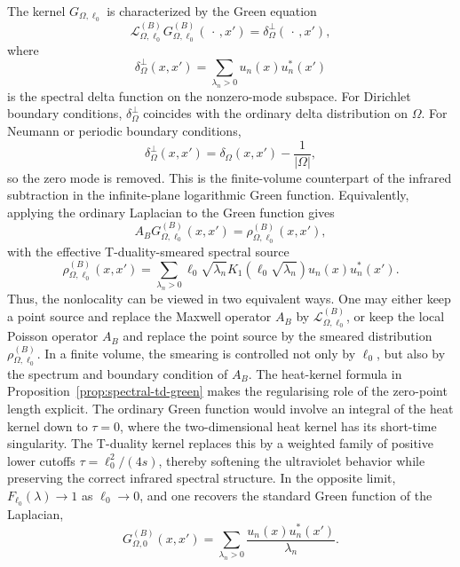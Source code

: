 \documentclass[nopacs,amsmath,amsfonts,amssymb,aps,superscriptaddress]{revtex4}
\begin{document}
The kernel $G_{\Omega,\ell_0}$ is characterized by the Green equation
\begin{equation}
  \mathcal L_{\Omega,\ell_0}^{(B)}G_{\Omega,\ell_0}^{(B)}(\,\cdot\,,x')
  =\delta_\Omega^\perp(\,\cdot\,,x'),
\end{equation}
where
\begin{equation}
  \delta_\Omega^\perp(x,x')
  =\sum_{\lambda_n>0}u_n(x)u_n^*(x')
\end{equation}
is the spectral delta function on the nonzero-mode subspace. For Dirichlet boundary conditions, $\delta_\Omega^\perp$ coincides with the ordinary delta distribution on $\Omega$. For Neumann or periodic boundary conditions,
\begin{equation}
  \delta_\Omega^\perp(x,x')=\delta_\Omega(x,x')-\frac{1}{|\Omega|},
\end{equation}
so the zero mode is removed. This is the finite-volume counterpart of the infrared subtraction in the infinite-plane logarithmic Green function. Equivalently, applying the ordinary Laplacian to the Green function gives
\begin{equation}
  A_B G_{\Omega,\ell_0}^{(B)}(x,x')=\rho_{\Omega,\ell_0}^{(B)}(x,x'),
\end{equation}
with the effective T-duality-smeared spectral source
\begin{equation}
  \rho_{\Omega,\ell_0}^{(B)}(x,x')
  =\sum_{\lambda_n>0}
  \ell_0\sqrt{\lambda_n}K_1\!\left(\ell_0\sqrt{\lambda_n}\right)
  u_n(x)u_n^*(x').
\end{equation}
Thus, the nonlocality can be viewed in two equivalent ways. One may either keep a point source and replace the Maxwell operator $A_B$ by $\mathcal L_{\Omega,\ell_0}^{(B)}$, or keep the local Poisson operator $A_B$ and replace the point source by the smeared distribution $\rho_{\Omega,\ell_0}^{(B)}$. In a finite volume, the smearing is controlled not only by $\ell_0$, but also by the spectrum and boundary condition of $A_B$. The heat-kernel formula in Proposition~\ref{prop:spectral-td-green} makes the regularising role of the zero-point length explicit. The ordinary Green function would involve an integral of the heat kernel down to $\tau=0$, where the two-dimensional heat kernel has its short-time singularity. The T-duality kernel replaces this by a weighted family of positive lower cutoffs $\tau=\ell_0^2/(4s)$, thereby softening the ultraviolet behavior while preserving the correct infrared spectral structure. In the opposite limit, $F_{\ell_0}(\lambda)\to1$ as $\ell_0\to0$, and one recovers the standard Green function of the Laplacian,
\begin{equation}
  G_{\Omega,0}^{(B)}(x,x')
  =\sum_{\lambda_n>0}\frac{u_n(x)u_n^*(x')}{\lambda_n}.
\end{equation}
\end{document}
